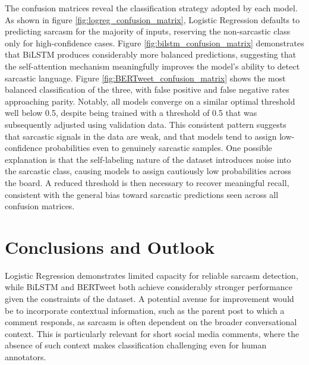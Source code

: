 \documentclass[
 reprint,
 amsmath,amssymb,
 aps,
]{revtex4-2}
\begin{document}
The confusion matrices reveal the classification strategy adopted by each model. As shown in figure \ref{fig:logreg_confusion_matrix}, Logistic Regression defaults to predicting sarcasm for the majority of inputs, reserving the non-sarcastic class only for high-confidence cases. Figure \ref{fig:bilstm_confusion_matrix} demonstrates that BiLSTM produces considerably more balanced predictions, suggesting that the self-attention mechanism meaningfully improves the model's ability to detect sarcastic language. Figure \ref{fig:BERTweet_confusion_matrix} shows the most balanced classification of the three, with false positive and false negative rates approaching parity. Notably, all models converge on a similar optimal threshold well below 0.5, despite being trained with a threshold of 0.5 that was subsequently adjusted using validation data. This consistent pattern suggests that sarcastic signals in the data are weak, and that models tend to assign low-confidence probabilities even to genuinely sarcastic samples. One possible explanation is that the self-labeling nature of the dataset introduces noise into the sarcastic class, causing models to assign cautiously low probabilities across the board. A reduced threshold is then necessary to recover meaningful recall, consistent with the general bias toward sarcastic predictions seen across all confusion matrices.



\section{\label{sec:conclusion}Conclusions and Outlook} %
\noindent
Logistic Regression demonstrates limited capacity for reliable sarcasm detection, while BiLSTM and BERTweet both achieve considerably stronger performance given the constraints of the dataset. A potential avenue for improvement would be to incorporate contextual information, such as the parent post to which a comment responds, as sarcasm is often dependent on the broader conversational context. This is particularly relevant for short social media comments, where the absence of such context makes classification challenging even for human annotators.

\end{document}
